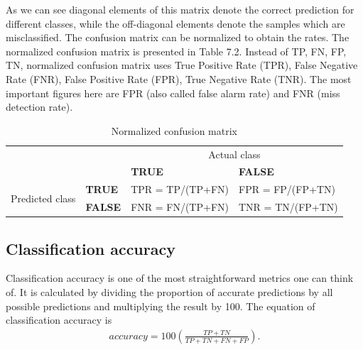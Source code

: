 As we can see diagonal elements of this matrix denote the correct prediction for different classes, while the off-diagonal elements denote the samples which are misclassified.
The confusion matrix can be normalized to obtain the rates. The normalized confusion matrix is presented in Table 7.2. Instead of TP, FN, FP, TN, normalized confusion matrix uses True Positive Rate (TPR), False Negative Rate (FNR), False Positive Rate (FPR), True Negative Rate (TNR). The most important figures here are FPR (also called false alarm rate) and FNR (miss detection rate).

\begin{table}[h!]
	\begin{tabular}{llll}
													   &                            & \multicolumn{2}{c}{Actual class}                                                 \\ \cline{3-4} 
													   & \multicolumn{1}{l|}{}      & \multicolumn{1}{l|}{\textbf{TRUE}}                & \multicolumn{1}{l|}{\textbf{FALSE}}               \\ \cline{2-4} 
	\multicolumn{1}{c|}{\multirow{2}{*}{Predicted class}} & \multicolumn{1}{l|}{\textbf{TRUE}}  & \multicolumn{1}{l|}{TPR = TP/(TP+FN)}  & \multicolumn{1}{l|}{FPR = FP/(FP+TN)} \\ \cline{2-4} 
	\multicolumn{1}{c|}{}                              & \multicolumn{1}{l|}{\textbf{FALSE}} & \multicolumn{1}{l|}{FNR = FN/(TP+FN)} & \multicolumn{1}{l|}{TNR = TN/(FP+TN)}  \\ \cline{2-4} 
	\end{tabular}
	\caption{\label{demo-table} Normalized confusion matrix}
\end{table} 

\subsection{Classification accuracy}
\hspace{0.5cm}Classification accuracy is one of the most straightforward metrics one can think of. It is calculated by dividing the proportion of accurate predictions by all possible predictions and multiplying the result by 100. The equation of classification accuracy is
\begin{align*}
	accuracy = 100\left (\frac{TP + TN}{TP + TN + FN + FP}  \right ).
\end{align*}


